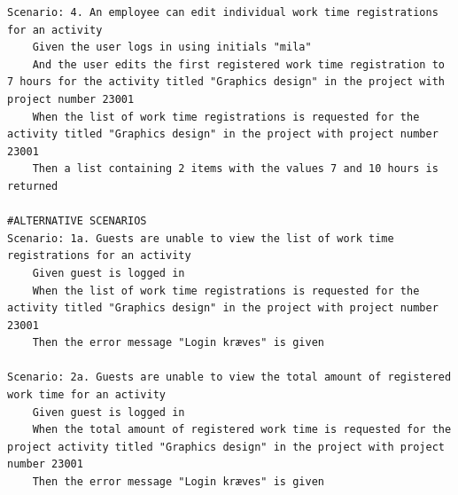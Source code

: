 \begin{listing}[H]
\begin{verbatim}
Scenario: 4. An employee can edit individual work time registrations for an activity
    Given the user logs in using initials "mila"
    And the user edits the first registered work time registration to 7 hours for the activity titled "Graphics design" in the project with project number 23001
    When the list of work time registrations is requested for the activity titled "Graphics design" in the project with project number 23001
    Then a list containing 2 items with the values 7 and 10 hours is returned

#ALTERNATIVE SCENARIOS
Scenario: 1a. Guests are unable to view the list of work time registrations for an activity
    Given guest is logged in
    When the list of work time registrations is requested for the activity titled "Graphics design" in the project with project number 23001
    Then the error message "Login kræves" is given

Scenario: 2a. Guests are unable to view the total amount of registered work time for an activity
    Given guest is logged in
    When the total amount of registered work time is requested for the project activity titled "Graphics design" in the project with project number 23001
    Then the error message "Login kræves" is given
    \end{verbatim}
\end{listing}
